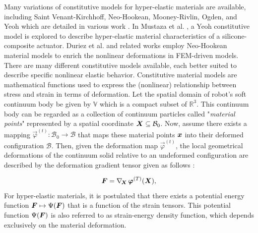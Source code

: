 Many variations of constitutive models for hyper-elastic materials are available, including Saint Venant-Kirchhoff, Neo-Hookean, Mooney-Rivlin, Ogden, and Yeoh  which are detailed in various work \cite{Meyer2009,Renaud2011,Kim2018}. In Mustaza et al. \cite{Mustaza2019}, a Yeoh constitutive model is explored to describe hyper-elastic material characteristics of a silicone-composite actuator. Duriez et al. \cite{Duriez2013} and related works \cite{Coevoet2017,Largilliere2015} employ Neo-Hookean material models to enrich the nonlinear deformations in FEM-driven models. There are many different constitutive models available, each better suited to describe specific nonlinear elastic behavior. Constitutive material models are mathematical functions used to express the (nonlinear) relationship between stress and strain in terms of deformation.  Let the spatial domain of robot's soft continuum body be given by $\mathbb{V}$ which is a compact subset of $\mathbb{R}^3$. This continuum body can be regarded as a collection of continuum particles called "\textit{material points}" represented by a spatial coordinate ${\boldsymbol{X}} \subseteq \mathcal{B}_0$. Now, assume there exists a mapping $\vec{\varphi}^{(t)}: \mathcal{B}_0 \to \mathcal{B}$ that maps these material points ${\boldsymbol{x}}$ into their deformed configuration $\mathcal{B}$. Then, given the deformation map $\vec{\varphi}^{(t)}$, the local geometrical deformations of the continuum solid relative to an undeformed configuration are described by the deformation gradient tensor given as follows \cite{Holzapfel2002,Kim2018}: \vspace{-3mm}

\begin{equation}
\boldsymbol{F} = \nabla_{\!{\boldsymbol{X}}}\,\boldsymbol{\varphi}^{(T)}({\boldsymbol{X}}),
\end{equation}
%
For hyper-elastic materials, it is postulated that there exists a potential energy function $\boldsymbol{F} \mapsto \Psi(\boldsymbol{F})$ that is a function of the strain tensors. This potential function $\Psi(\boldsymbol{F})$ is also referred to as strain-energy density function, which depends exclusively on the material deformation.

